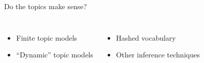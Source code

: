 \documentclass[xcolor=dvipsnames]{beamer}
\begin{document}
\begin{frame}{Do the topics make sense?}

\begin{columns}
\begin{itemize}
  \item Finite topic models
  \item ``Dynamic'' topic models
\end{itemize}

\begin{itemize}
  \item Hashed vocabulary
  \item Other inference techniques
\end{itemize}
\end{columns}


\end{frame}



%
\end{document}
